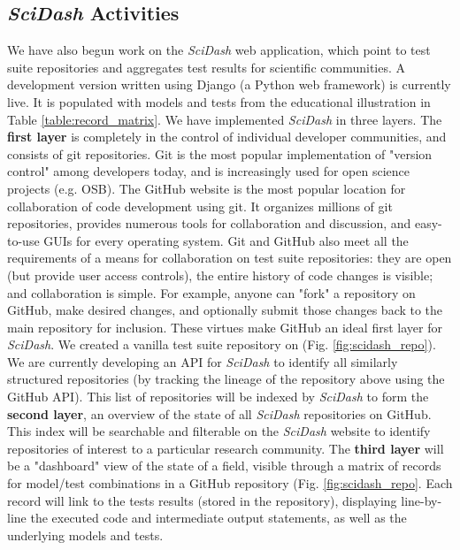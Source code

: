 \documentclass[11pt,letterpaper]{article}
\begin{document}
\subsection{\textit{SciDash} Activities}\label{sec:scidash_activities}
We have also begun work on the \textit{SciDash} web application, which point to test suite repositories and aggregates test results for scientific communities. A development version written using Django (a Python web framework) is currently live\cite{scidash_url}.  It is populated with models and tests from the educational illustration in Table \ref{table:record_matrix}.  We have implemented \textit{SciDash} in three layers.  The \textbf{first layer} is completely in the control of individual developer communities, and consists of git repositories.  Git is the most popular implementation of "version control" among developers today\cite{ram_git_2013}, and is increasingly used for open science projects (e.g. OSB\cite{osb_url}).  The GitHub website\cite{github_url} is the most popular location for collaboration of code development using git.  It organizes millions of git repositories, provides numerous tools for collaboration and discussion, and easy-to-use GUIs for every operating system.  Git and GitHub also meet all the requirements of a means for collaboration on test suite repositories: they are open (but provide user access controls), the entire history of code changes is visible; and collaboration is simple.  For example, anyone can "fork" a repository on GitHub, make desired changes, and optionally submit those changes back to the main repository for inclusion.  These virtues make GitHub an ideal first layer for \textit{SciDash}.  We created a vanilla test suite repository\cite{scidash_repo_url} on  (Fig. \ref{fig:scidash_repo}).  We are currently developing an API for \textit{SciDash} to identify all similarly structured repositories (by tracking the lineage of the repository above using the GitHub API).  This list of repositories will be indexed by \textit{SciDash} to form the \textbf{second layer}, an overview of the state of all \textit{SciDash} repositories on GitHub.  This index will be searchable and filterable on the \textit{SciDash} website to identify repositories of interest to a particular research community.  The \textbf{third layer} will be a "dashboard" view of the state of a field, visible through a matrix of records for model/test combinations in a GitHub repository (Fig. \ref{fig:scidash_repo}.  Each record will link to the tests results (stored in the repository), displaying line-by-line the executed code and intermediate output statements, as well as the underlying models and tests.   
\end{document}
